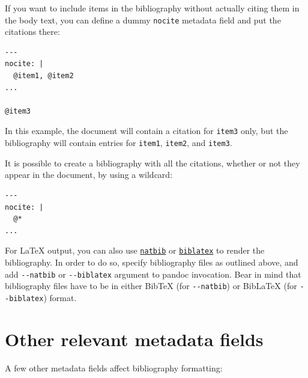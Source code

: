 \documentclass[
  b5paper
]{book}
\begin{document}
If you want to include items in the bibliography without actually citing
them in the body text, you can define a dummy \texttt{nocite} metadata
field and put the citations there:

\begin{verbatim}
---
nocite: |
  @item1, @item2
...

@item3
\end{verbatim}

In this example, the document will contain a citation for \texttt{item3}
only, but the bibliography will contain entries for \texttt{item1},
\texttt{item2}, and \texttt{item3}.

It is possible to create a bibliography with all the citations, whether
or not they appear in the document, by using a wildcard:

\begin{verbatim}
---
nocite: |
  @*
...
\end{verbatim}

For LaTeX output, you can also use
\href{https://ctan.org/pkg/natbib}{\texttt{natbib}} or
\href{https://ctan.org/pkg/biblatex}{\texttt{biblatex}} to render the
bibliography. In order to do so, specify bibliography files as outlined
above, and add \texttt{-\/-natbib} or \texttt{-\/-biblatex} argument to
pandoc invocation. Bear in mind that bibliography files have to be in
either BibTeX (for \texttt{-\/-natbib}) or BibLaTeX (for
\texttt{-\/-biblatex}) format.

\section{Other relevant metadata
fields}\label{other-relevant-metadata-fields}

A few other metadata fields affect bibliography formatting:
\end{document}
